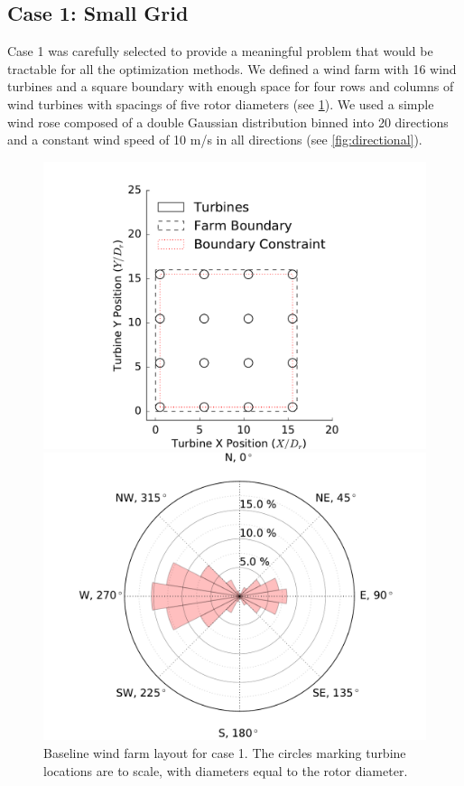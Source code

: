 \documentclass[a4paper]{jpconf}
\begin{document}
\subsection{Case 1: Small Grid}
Case 1 was carefully selected to provide a meaningful problem that would be tractable for all the optimization methods. We defined a wind farm with 16 wind turbines and a square boundary with enough space for four rows and columns of wind turbines with spacings of five rotor diameters (see \cref{fig:grid_case}). We used a simple wind rose composed of a double Gaussian distribution binned into 20 directions and a constant wind speed of 10 m/s in all directions (see \cref{fig:directional}).
\begin{figure}[h!]
\centering
\begin{minipage}[t]{18pc}
\centering
\includegraphics[width=1.\textwidth, trim={3cm, 0cm, 3cm, 0cm}, clip]{final_images/grid_farm_16Turbines_5DSpacing_start.pdf}
\caption{Baseline wind farm layout for case 1. The circles marking turbine locations are to scale, with diameters equal to the rotor diameter.}
\label{fig:grid_case}
\end{minipage}\hspace{1pc}%
\begin{minipage}[t]{18pc}
\centering
\includegraphics[width=\textwidth, trim={1.5cm 0cm 1.5cm 0cm}, clip]{final_images/directional_windrose.pdf}

\end{minipage}
\end{figure}
\end{document}
